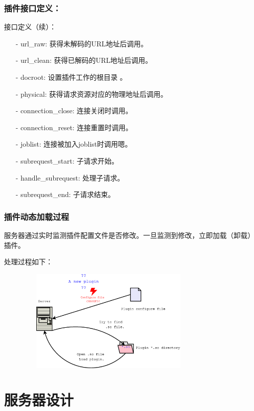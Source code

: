 \documentclass[10pt,dvipdfm]{beamer}
\begin{document}
\begin{frame}
	\frametitle{插件接口定义：}
	\begin{block}{接口定义（续）：}
	\begin{itemize}
		\item[-] url\_raw: 获得未解码的URL地址后调用。
		\item[-] url\_clean: 获得已解码的URL地址后调用。
		\item[-] docroot: 设置插件工作的根目录 。
		\item[-] physical: 获得请求资源对应的物理地址后调用。
		\item[-] connection\_close: 连接关闭时调用。
		\item[-] connection\_reset: 连接重置时调用。
		\item[-] joblist: 连接被加入joblist时调用嗯。
		\item[-] subrequest\_start: 子请求开始。
		\item[-] handle\_subrequest: 处理子请求。
		\item[-] subrequest\_end: 子请求结束。
	\end{itemize}
	\end{block}
\end{frame}


\begin{frame}
	\frametitle{插件动态加载过程}
	
	服务器通过实时监测插件配置文件是否修改。一旦监测到修改，立即加载（卸载）插件。
	
	\pause
	
	\begin{block}{处理过程如下：}
	\begin{figure}[htbp]
	\centering
	\includegraphics[height=5cm, width=9cm]{pics/loadplugin.eps}
	\end{figure}
	\end{block}
\end{frame}

\section{服务器设计}
\end{document}
